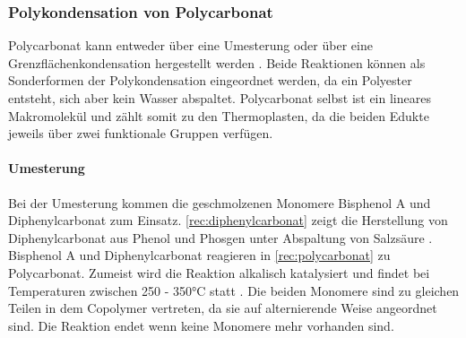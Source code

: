 \subsubsection{Polykondensation von Polycarbonat}

Polycarbonat kann entweder über eine Umesterung oder über eine
Grenzflächenkondensation hergestellt werden \cite{cuzpe}. Beide Reaktionen
können als Sonderformen der Polykondensation eingeordnet werden, da ein
Polyester entsteht, sich aber kein Wasser abspaltet. Polycarbonat selbst ist ein
lineares Makromolekül und zählt somit zu den Thermoplasten, da die beiden Edukte
jeweils über zwei funktionale Gruppen verfügen.

\paragraph{Umesterung} Bei der Umesterung kommen die geschmolzenen Monomere
Bisphenol A und Diphenylcarbonat zum Einsatz. \autoref{rec:diphenylcarbonat}
zeigt die Herstellung von Diphenylcarbonat aus Phenol und Phosgen unter
Abspaltung von Salzsäure \cite{cuzpe}. Bisphenol A und Diphenylcarbonat
reagieren in \autoref{rec:polycarbonat} zu Polycarbonat. Zumeist wird die
Reaktion alkalisch katalysiert und findet bei Temperaturen zwischen 250 - 350°C
statt \cite{pop}. Die beiden Monomere sind zu gleichen Teilen in dem Copolymer
vertreten, da sie auf alternierende Weise angeordnet sind. Die Reaktion endet
wenn keine Monomere mehr vorhanden sind.


